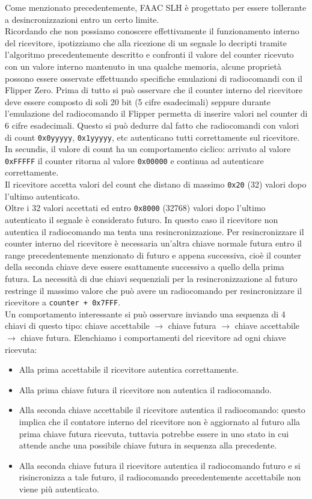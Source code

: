 Come menzionato precedentemente, FAAC SLH è progettato per essere tollerante a desincronizzazioni entro un certo limite.\\
Ricordando che non possiamo conoscere effettivamente il funzionamento interno del ricevitore, ipotizziamo che alla ricezione di un segnale lo decripti tramite l’algoritmo precedentemente descritto e confronti il valore del counter ricevuto con un valore interno mantenuto in una qualche memoria, alcune proprietà possono essere osservate effettuando specifiche emulazioni di radiocomandi con il Flipper Zero.
Prima di tutto si può osservare che il counter interno del ricevitore deve essere composto di soli 20 bit (5 cifre esadecimali) seppure durante l’emulazione del radiocomando il Flipper permetta di inserire valori nel counter di 6 cifre esadecimali. Questo si può dedurre dal fatto che radiocomandi con valori di count \texttt{0x0yyyyy}, \texttt{0x1yyyyy}, etc autenticano tutti correttamente sul ricevitore.\\
In secundis, il valore di count ha un comportamento ciclico: arrivato al valore \texttt{0xFFFFF} il counter ritorna al valore \texttt{0x00000} e continua ad autenticare correttamente.\\
Il ricevitore accetta valori del count che distano di massimo \texttt{0x20} (32) valori dopo l’ultimo autenticato.\\
Oltre i 32 valori accettati ed entro \texttt{0x8000} (32768) valori dopo l’ultimo autenticato il segnale è considerato futuro. In questo caso il ricevitore non autentica il radiocomando ma tenta una resincronizzazione. Per resincronizzare il counter interno del ricevitore è necessaria un’altra chiave normale futura entro il range precedentemente menzionato di futuro e appena successiva, cioè il counter della seconda chiave deve essere esattamente successivo a quello della prima futura. La necessità di due chiavi sequenziali per la resincronizzazione al futuro restringe il massimo valore che può avere un radiocomando per resincronizzare il ricevitore a \texttt{counter + 0x7FFF}.\\
Un comportamento interessante si può osservare inviando una sequenza di 4 chiavi di questo tipo: chiave accettabile \(\rightarrow\) chiave futura \(\rightarrow\) chiave accettabile \(\rightarrow\) chiave futura. Elenchiamo i comportamenti del ricevitore ad ogni chiave ricevuta:
\begin{itemize}
  \item Alla prima accettabile il ricevitore autentica correttamente.
  \item Alla prima chiave futura il ricevitore non autentica il radiocomando.
  \item Alla seconda chiave accettabile il ricevitore autentica il radiocomando: questo implica che il contatore interno del ricevitore non è aggiornato al futuro alla prima chiave futura ricevuta, tuttavia potrebbe essere in uno stato in cui attende anche una possibile chiave futura in sequenza alla precedente.
  \item Alla seconda chiave futura il ricevitore autentica il radiocomando futuro e si risincronizza a tale futuro, il radiocomando precedentemente accettabile non viene più autenticato.
\end{itemize}
